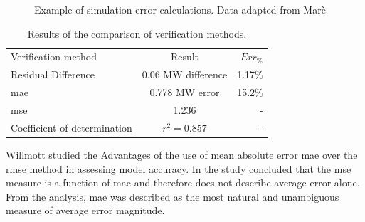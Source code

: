  	\begin{figure}[h!]
 		\centering
 		
 		\caption[Example of simulation error calculations]{Example of simulation error calculations. Data adapted from Marè \cite{Mare2016PhD}}
 		\label{fig:Philipp Difference verify}
 	\end{figure}
 
 \begin{table}[h!]
 	\label{Philip verification table}
 	\centering
 	\begin{tabular}{lcr}
 		\hline
 		Verification method & Result & $Err_{\%}$\\
 		\hhline{===}
 		Residual Difference     & 0.06 MW difference & 1.17\% \\
 		\gls{mae} 					 & 0.778 MW error & 15.2\% \\
 		\gls{mse} 				   & 1.236  & -\\
 		Coefficient of determination & $r^2 =0.857$  & -\\
 		\hline
 	\end{tabular} 
 \caption{Results of the comparison of verification methods.}
 \end{table}
 
 	\par 
 	Willmott \cite{willmott2005advantages} studied the Advantages of the use of mean absolute error \gls{mae} over the \gls{rmse} method in assessing model accuracy. In the study \cite{willmott2005advantages} concluded that the \gls{mse} measure is a function of \gls{mae} and therefore does not describe average error alone. From the analysis, \gls{mae} was described as the most natural and unambiguous measure of average error magnitude.

